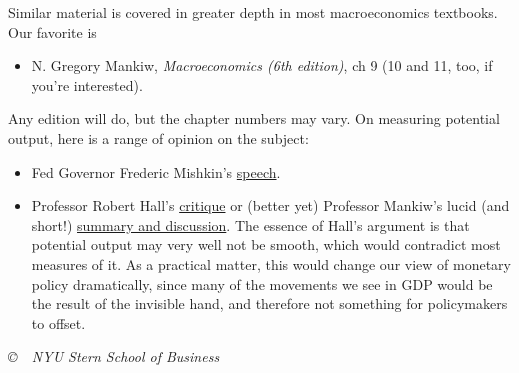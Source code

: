 \documentclass[letterpaper,12pt]{article}
\begin{document}
Similar material is covered in greater depth 
in most macroeconomics textbooks.  
Our favorite is 
%
\begin{itemize}
\item N. Gregory Mankiw, {\it Macroeconomics (6th edition)\/}, ch 9
(10 and 11, too, if you're interested).

\end{itemize}
%
Any edition will do, but the chapter numbers may vary.  
On measuring potential output, 
here is a range of opinion on the subject:
%
\begin{itemize} 
\item Fed Governor Frederic Mishkin's 
\href{http://www.federalreserve.gov/newsevents/speech/mishkin20070524a.htm}{speech}.

\item Professor Robert Hall's 
\href{http://www.kc.frb.org/publicat/Sympos/2005/PDF/Hall2005.pdf}{critique} or
(better yet) Professor Mankiw's lucid (and short!) 
\href{http://www.kc.frb.org/publicat/Sympos/2005/PDF/Mankiw2005.pdf}{summary and discussion}.  
The essence of Hall's argument is that potential output may very well not be smooth, 
which would contradict most measures of it.
As a practical matter, this would change our view of monetary policy dramatically, 
since many of the movements we see in GDP would be the result of the invisible hand, 
and therefore not something for policymakers to offset. 

\end{itemize}


\vfill \centerline{\it \copyright \ \number\year \ NYU Stern
School of Business}
\end{document}
